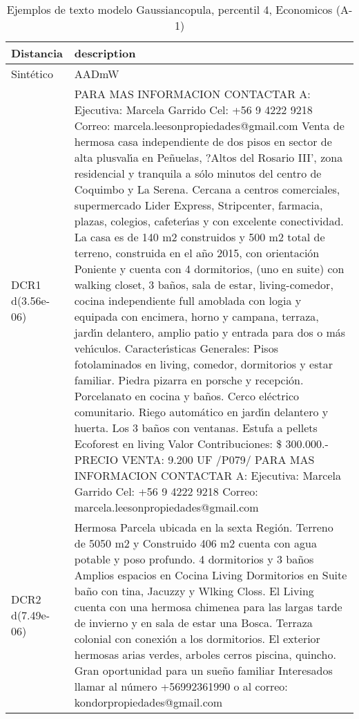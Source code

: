 \begin{table}[H]
\centering
\fontsize{10}{14}\selectfont
\caption{Ejemplos de texto modelo Gaussiancopula, percentil 4, Economicos (A-1)}
\label{table-example-economicos-a-1-gaussiancopula-4p-text}
\begin{tabular}{|l|m{35em}|}
\hline
\rowcolor[gray]{0.8}
Distancia & description \\
\hline Sintético & AADmW \\
\hline DCR1 d(3.56e-06) & PARA MAS INFORMACION CONTACTAR A:  Ejecutiva: Marcela Garrido  Cel: +56 9 4222 9218 Correo: marcela.leesonpropiedades@gmail.com   Venta de hermosa casa independiente de dos pisos en sector de alta plusval{\'\i}a en Pe\~nuelas, ?Altos del Rosario III', zona residencial y tranquila a s\'olo minutos del centro de Coquimbo y La Serena. Cercana a centros comerciales, supermercado Lider Express, Stripcenter, farmacia, plazas, colegios, cafeter{\'\i}as y con excelente conectividad.  La casa es de 140 m2 construidos y 500 m2 total de terreno, construida en el a\~no 2015, con orientaci\'on Poniente y cuenta con 4 dormitorios, (uno en suite) con walking closet, 3 ba\~nos, sala de estar, living-comedor, cocina independiente full amoblada con logia y equipada con encimera, horno y campana, terraza, jard{\'\i}n delantero, amplio patio y entrada para dos o m\'as veh{\'\i}culos.  Caracter{\'\i}sticas Generales:  Pisos fotolaminados en living, comedor, dormitorios y estar familiar. Piedra pizarra en porsche y recepci\'on. Porcelanato en cocina y ba\~nos. Cerco el\'ectrico comunitario. Riego autom\'atico en jard{\'\i}n delantero y huerta. Los 3 ba\~nos con ventanas. Estufa a pellets Ecoforest en living Valor Contribuciones: \$ 300.000.-  PRECIO VENTA: 9.200 UF  /P079/  PARA MAS INFORMACION CONTACTAR A:  Ejecutiva: Marcela Garrido  Cel: +56 9 4222 9218 Correo: marcela.leesonpropiedades@gmail.com \\
\hline DCR2 d(7.49e-06) & Hermosa Parcela  ubicada en la sexta Regi\'on. Terreno de 5050 m2 y Construido 406 m2 cuenta con agua potable y poso profundo.
 4 dormitorios y 3 ba\~nos Amplios espacios en Cocina Living Dormitorios en Suite  ba\~no con tina, Jacuzzy  y Wlking Closs. El Living cuenta con una hermosa chimenea  para las largas tarde de invierno y en sala de estar una Bosca. Terraza colonial con conexi\'on a los dormitorios.  El exterior hermosas arias verdes, arboles cerros piscina, quincho.  Gran oportunidad para un sue\~no familiar  
Interesados llamar al n\'umero +56992361990 o al correo: kondorpropiedades@gmail.com \\
\hline
\end{tabular}
\end{table}
